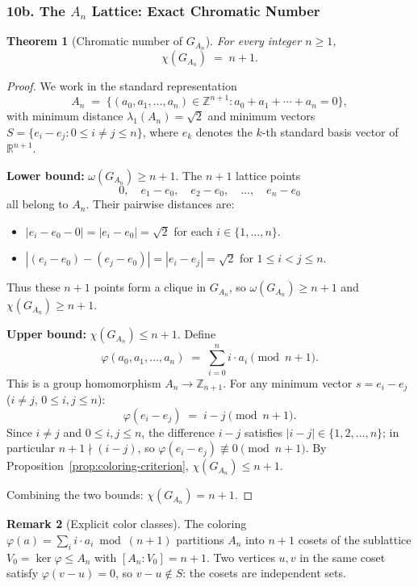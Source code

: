 \documentclass{article}
\newtheorem{theorem}{Theorem}[section]
\theoremstyle{definition}
\newtheorem{remark}[theorem]{Remark}
\begin{document}
\subsubsection*{10b. The $A_n$ Lattice: Exact Chromatic Number}

\begin{theorem}[Chromatic number of $G_{A_n}$]\label{thm:An-coloring}
For every integer $n \ge 1$,
\[
  \chi(G_{A_n}) \;=\; n + 1.
\]
\end{theorem}

\begin{proof}
We work in the standard representation
\[
  A_n \;=\; \bigl\{(a_0, a_1, \ldots, a_n) \in \mathbb{Z}^{n+1} : a_0 + a_1 + \cdots + a_n = 0\bigr\},
\]
with minimum distance $\lambda_1(A_n) = \sqrt{2}$ and minimum vectors $S = \{e_i - e_j : 0 \le i \neq j \le n\}$, where $e_k$ denotes the $k$-th standard basis vector of $\mathbb{R}^{n+1}$.

\textbf{Lower bound:} $\omega(G_{A_n}) \ge n+1$.  The $n+1$ lattice points
\[
  0,\quad e_1 - e_0,\quad e_2 - e_0,\quad \ldots,\quad e_n - e_0
\]
all belong to $A_n$.  Their pairwise distances are:
\begin{itemize}
  \item $|e_i - e_0 - 0| = |e_i - e_0| = \sqrt{2}$ for each $i \in \{1, \ldots, n\}$.
  \item $|(e_i - e_0) - (e_j - e_0)| = |e_i - e_j| = \sqrt{2}$ for $1 \le i < j \le n$.
\end{itemize}
Thus these $n+1$ points form a clique in $G_{A_n}$, so $\omega(G_{A_n}) \ge n+1$ and $\chi(G_{A_n}) \ge n+1$.

\textbf{Upper bound:} $\chi(G_{A_n}) \le n+1$.  Define
\[
  \varphi(a_0, a_1, \ldots, a_n) \;=\; \sum_{i=0}^n i \cdot a_i \pmod{n+1}.
\]
This is a group homomorphism $A_n \to \mathbb{Z}_{n+1}$.  For any minimum vector $s = e_i - e_j$ ($i \neq j$, $0 \le i, j \le n$):
\[
  \varphi(e_i - e_j) \;=\; i - j \pmod{n+1}.
\]
Since $i \neq j$ and $0 \le i, j \le n$, the difference $i - j$ satisfies $|i-j| \in \{1, 2, \ldots, n\}$; in particular $n+1 \nmid (i-j)$, so $\varphi(e_i - e_j) \not\equiv 0 \pmod{n+1}$.  By Proposition~\ref{prop:coloring-criterion}, $\chi(G_{A_n}) \le n+1$.

Combining the two bounds: $\chi(G_{A_n}) = n+1$.
\end{proof}

\begin{remark}[Explicit color classes]
The coloring $\varphi(a) = \sum_i i \cdot a_i \bmod (n+1)$ partitions $A_n$ into $n+1$ cosets of the sublattice $V_0 = \ker\varphi \le A_n$ with $[A_n : V_0] = n+1$.  Two vertices $u, v$ in the same coset satisfy $\varphi(v-u) = 0$, so $v - u \notin S$: the cosets are independent sets.
\end{remark}
\end{document}
